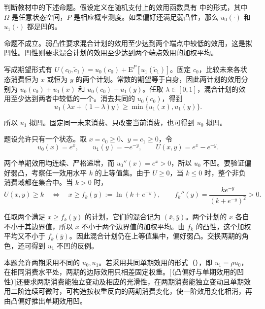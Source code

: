 \begin{problem}
\WJSixProblem{} 判断教材中的下述命题。假设定义在随机支付上的效用函数具有 中的形式，其中 $\Omega$ 是任意状态空间，$P$ 是相应概率测度。如果偏好还满足弱凸性，那么 $u_0(\cdot)$ 和 $u_1(\cdot)$ 都是凹的。
\end{problem}
\begin{solution}[label-content={反例},blank-type=manual,blank-vsep=9\baselineskip]
命题不成立。弱凸性要求混合计划的效用至少达到两个端点中较低的效用，这是拟凹性。凹性则要求混合计划的效用至少达到两个端点效用的加权平均。

写成期望形式有 $U(c_0,\widetilde c_1)=u_0(c_0)+\mathrm E^P[u_1(\widetilde c_1)]$。固定 $c_0$，比较未来各状态消费恒为 $x$ 或恒为 $y$ 的两个计划。常数的期望等于自身，因此两计划的效用分别为 $u_0(c_0)+u_1(x)$ 和 $u_0(c_0)+u_1(y)$。任取 $\lambda\in[0,1]$，混合计划的效用至少达到两者中较低的一个。消去共同的 $u_0(c_0)$，得到
\[
 u_1(\lambda x+(1-\lambda)y)\ge\min\{u_1(x),u_1(y)\}.
\]

所以 $u_1$ 拟凹。固定同一未来消费、只改变当前消费，也可得到 $u_0$ 拟凹。

题设允许只有一个状态。取 $x=c_0\ge0$、$y=c_1\ge0$，令
\[
 u_0(x)=e^x,\qquad u_1(y)=-e^{-y},\qquad U(x,y)=e^x-e^{-y}.
\]

两个单期效用均连续、严格递增，而 $u_0''(x)=e^x>0$，所以 $u_0$ 不凹。要验证偏好弱凸，考察任一效用水平 $k$ 的上等值集。由于 $U\ge0$，当 $k\le0$ 时，整个非负消费域都在集合中。当 $k>0$ 时，
\[
 U(x,y)\ge k\quad\Longleftrightarrow\quad x\ge f_k(y):=\ln(k+e^{-y}),
 \qquad f_k''(y)=\frac{k e^{-y}}{(k+e^{-y})^2}>0.
\]

任取两个满足 $x\ge f_k(y)$ 的计划，它们的混合记为 $(\bar x,\bar y)$。两个计划的 $x$ 各自不小于其边界值，所以 $\bar x$ 不小于两个边界值的加权平均。由 $f_k$ 的凸性，这个加权平均又不小于 $f_k(\bar y)$。因此混合计划仍在上等值集中，偏好弱凸。交换两期的角色，还可得到 $u_1$ 不凹的反例。

本题允许两期采用不同的 $u_0,u_1$。若采用共同单期效用的形式\ifdefined\WJHandoutKnowledge（）\fi，即 $u_1=\rho u_0$，在相同消费水平处，两期的边际效用只相差固定权重。\ifdefined\WJHandoutKnowledge{}[（凸偏好与单期效用的凹性）]还要求两期消费能独立变动及相应的光滑性，\else 在两期消费能独立变动且单期效用二阶连续可微时，\fi 可构造按权重反向的两期消费变化，使一阶效用变化相消，再由凸偏好推出单期效用凹。
\end{solution}

